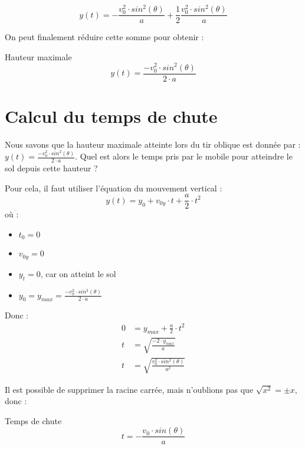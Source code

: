 \begin{equation}
    y(t)=- \frac{v_0^2 \cdot sin^2(\theta)}{a} + \frac{1}{2} \frac{v_0^2 \cdot sin^2(\theta)}{a}
\end{equation}

On peut finalement réduire cette somme pour obtenir :

\begin{encadre_equation*}{Hauteur maximale}
    \begin{equation}
        y(t)=\frac{-v_0^2 \cdot sin^2(\theta)}{2 \cdot a}
    \end{equation}
\end{encadre_equation*}

\section{Calcul du temps de chute}
Nous savons que la hauteur maximale atteinte lors du tir oblique est donnée par : \(y(t)=\frac{-v_0^2 \cdot sin^2(\theta)}{2 \cdot a}\). Quel est alors le temps pris par le mobile pour atteindre le sol depuis cette hauteur ?

Pour cela, il faut utiliser l'équation du mouvement vertical :
\begin{equation}
    y(t)=y_0 + v_{0y} \cdot t + \frac{a}{2} \cdot t^2
\end{equation} où :

\begin{itemize}[label=\textbullet]
    \item \(t_0=0\)
    \item \(v_{0y}=0\)
    \item \(y_t=0\), car on atteint le sol
    \item \(y_0=y_{max}=\frac{-v_0^2 \cdot sin^2(\theta)}{2 \cdot a}\)
\end{itemize}

Donc :
\begin{align}
    0 & =y_{max}+\frac{a}{2} \cdot t^2                 \\
    t & =\sqrt{\frac{-2 \cdot y_{max}}{a}}             \\
    t & =\sqrt{\frac{v_0^2 \cdot sin^2 (\theta)}{a^2}}
\end{align}

Il est possible de supprimer la racine carrée, mais n'oublions pas que \(\sqrt{x^2}=\pm x\), donc :
\begin{encadre_equation*}{Temps de chute}
    \begin{equation}
        t=-\frac{v_0 \cdot sin(\theta)}{a}
    \end{equation}
\end{encadre_equation*}


